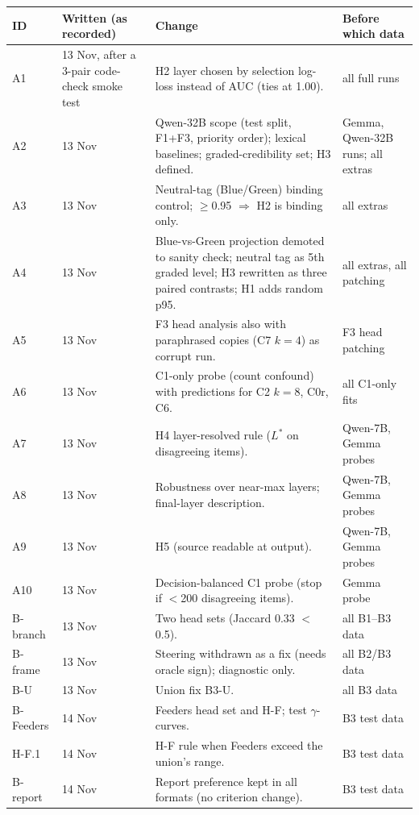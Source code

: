 \begin{table}[!htbp]\centering\scriptsize
\begin{tabular}{@{}p{1.3cm}p{2.2cm}p{8.4cm}p{2.6cm}@{}}\toprule
ID & Written (as recorded) & Change & Before which data \\ \midrule
A1 & 13 Nov, after a 3-pair code-check smoke test & H2 layer chosen by selection log-loss instead of AUC (ties at 1.00). & all full runs \\
A2 & 13 Nov & Qwen-32B scope (test split, F1+F3, priority order); lexical baselines; graded-credibility set; H3 defined. & Gemma, Qwen-32B runs; all extras \\
A3 & 13 Nov & Neutral-tag (Blue/Green) binding control; $\ge$0.95 $\Rightarrow$ H2 is binding only. & all extras \\
A4 & 13 Nov & Blue-vs-Green projection demoted to sanity check; neutral tag as 5th graded level; H3 rewritten as three paired contrasts; H1 adds random p95. & all extras, all patching \\
A5 & 13 Nov & F3 head analysis also with paraphrased copies (C7 $k{=}4$) as corrupt run. & F3 head patching \\
A6 & 13 Nov & C1-only probe (count confound) with predictions for C2 $k{=}8$, C0r, C6. & all C1-only fits \\
A7 & 13 Nov & H4 layer-resolved rule ($L^*$ on disagreeing items). & Qwen-7B, Gemma probes \\
A8 & 13 Nov & Robustness over near-max layers; final-layer description. & Qwen-7B, Gemma probes \\
A9 & 13 Nov & H5 (source readable at output). & Qwen-7B, Gemma probes \\
A10 & 13 Nov & Decision-balanced C1 probe (stop if $<$200 disagreeing items). & Gemma probe \\
B-branch & 13 Nov & Two head sets (Jaccard 0.33 $<$ 0.5). & all B1--B3 data \\
B-frame & 13 Nov & Steering withdrawn as a fix (needs oracle sign); diagnostic only. & all B2/B3 data \\
B-U & 13 Nov & Union fix B3-U. & all B3 data \\
B-Feeders & 14 Nov & Feeders head set and H-F; test $\gamma$-curves. & B3 test data \\
H-F.1 & 14 Nov & H-F rule when Feeders exceed the union's range. & B3 test data \\
B-report & 14 Nov & Report preference kept in all formats (no criterion change). & B3 test data \\

\end{tabular}
\end{table}
